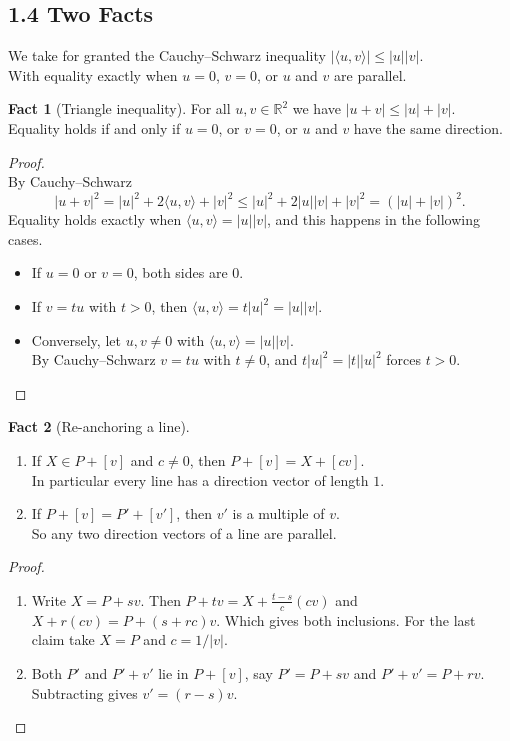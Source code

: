 \documentclass[11pt,a4paper]{article}
\theoremstyle{boxed}
\theoremstyle{definition}
\newtheorem{fact}{Fact}
\newcommand{\R}{\mathbb{R}}
\newcommand{\ip}[2]{\langle #1, #2 \rangle}
\newcommand{\abs}[1]{\lvert #1 \rvert}
\begin{document}
\subsection*{1.4 Two Facts}
We take for granted the Cauchy--Schwarz inequality $\abs{\ip{u}{v}}\le\abs{u}\abs{v}$. \\
With equality exactly when $u=0$, $v=0$, or $u$ and $v$ are parallel.

\begin{fact}[Triangle inequality]\label{f:triangle}
For all $u,v\in\R^2$ we have $\abs{u+v}\le\abs{u}+\abs{v}$.
Equality holds if and only if $u=0$, or $v=0$, or $u$ and $v$ have the same direction.
\end{fact}

\begin{proof}
\leavevmode\\
By Cauchy--Schwarz
\[
\abs{u+v}^2=\abs{u}^2+2\ip{u}{v}+\abs{v}^2\le\abs{u}^2+2\abs{u}\abs{v}+\abs{v}^2=(\abs{u}+\abs{v})^2.
\]
Equality holds exactly when $\ip{u}{v}=\abs{u}\abs{v}$, and this happens in the following cases.
\begin{itemize}[nosep]
    \item If $u=0$ or $v=0$, both sides are $0$.
    \item If $v=tu$ with $t>0$, then $\ip{u}{v}=t\abs{u}^2=\abs{u}\abs{v}$.
    \item Conversely, let $u,v\neq0$ with $\ip{u}{v}=\abs{u}\abs{v}$.\\
    By Cauchy--Schwarz $v=tu$ with $t\neq0$, and $t\abs{u}^2=\abs{t}\abs{u}^2$ forces $t>0$. \qedhere
\end{itemize}
\end{proof}

\begin{fact}[Re-anchoring a line]\label{f:anchor}
\leavevmode
\begin{enumerate}
    \item If $X\in P+[v]$ and $c\neq0$, then $P+[v]=X+[cv]$. \\
    In particular every line has a direction vector of length $1$.
    \item If $P+[v]=P'+[v']$, then $v'$ is a multiple of $v$. \\
    So any two direction vectors of a line are parallel.
\end{enumerate}
\end{fact}

\begin{proof}
\leavevmode
\begin{enumerate}
    \item Write $X=P+sv$.
    Then $P+tv=X+\tfrac{t-s}{c}(cv)$ and $X+r(cv)=P+(s+rc)v$. Which gives both inclusions.
    For the last claim take $X=P$ and $c=1/\abs{v}$.
    \item Both $P'$ and $P'+v'$ lie in $P+[v]$, say $P'=P+sv$ and $P'+v'=P+rv$. \\
    Subtracting gives $v'=(r-s)v$. \qedhere
\end{enumerate}
\end{proof}
\end{document}
